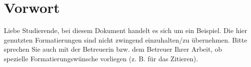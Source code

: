 



\ihead{}
\chead{}
\ohead{\leftmark}

\ifoot{}
\cfoot{\pagemark}
\ofoot{}


\chapter{Vorwort}
\label{20_00_00_00_00_00_00_00_00_00}

\thispagestyle{plain}



Liebe Studierende, bei diesem Dokument handelt es sich um ein Beispiel. Die hier genutzten Formatierungen sind nicht zwingend einzuhalten/zu übernehmen. Bitte sprechen Sie auch mit der Betreuerin bzw. dem Betreuer Ihrer Arbeit, ob spezielle Formatierungswünsche vorliegen (z. B. für das Zitieren).